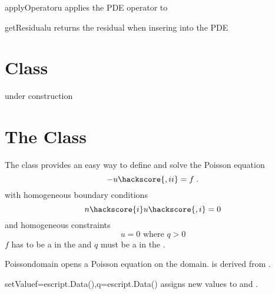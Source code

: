 \begin{methoddesc}[LinearPDE]{applyOperator}{u}
applies the PDE operator to 
\end{methoddesc}

\begin{methoddesc}[LinearPDE]{getResidual}{u}
returns the residual when insering  into the PDE
\end{methoddesc}

\section{\AdvectivePDE Class}
under construction

\section{The \Poisson Class}

The \Poisson class provides an easy way to define and solve the Poisson
equation
\begin{equation}\label{POISSON.1}
-u\hackscore{,ii}=f\; .
\end{equation}
with homogeneous boundary conditions
\begin{equation}\label{POISSON.2}
n\hackscore{i}u\hackscore{,i}=0
\end{equation}
and homogeneous constraints
\begin{equation}\label{POISSON.3}
u=0 \mbox{ where } q>0
\end{equation}
$f$ has to be a \Scalar in the \Function and $q$ must be
a \Scalar in  the \SolutionFS. 

\begin{classdesc}{Poisson}{domain}
opens a Poisson equation on the \Domain domain. \Poisson is derived from \LinearPDE.
\end{classdesc}
\begin{methoddesc}[Poisson]{setValue}{f=escript.Data(),q=escript.Data()}
assigns new values to  and .
\end{methoddesc}
